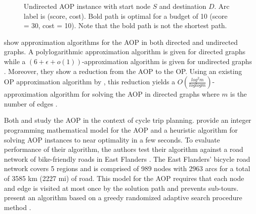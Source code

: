 \documentclass[honors]{union-cs-thesis}
\begin{document}
\begin{figure}[h]
\begin{center}
\end{center}
\caption{Undirected AOP instance with start node $S$ and destination $D$. Arc label is (score, cost). Bold path is optimal for a budget of 10 (score = 30, cost = 10). Note that the bold path is not the shortest path.\label{fig:aop-example}}
\end{figure}

 
\citeauthor{gavalas2015approximation} show approximation algorithms for the AOP in both directed and undirected graphs. A polylogarithmic approximation algorithm is given for directed graphs while a $(6 + \epsilon + o(1))$-approximation algorithm is given for undirected graphs \cite{gavalas2015approximation}. Moreover, they show a reduction from the AOP to the OP. Using an existing OP approximation algorithm by \citeauthor{nagarajan2011directed}, this reduction yields a $O(\frac{log^2m}{loglogm})$-approximation algorithm for solving the AOP in directed graphs where $m$ is the number of edges \cite{gavalas2015approximation}.

Both \citeauthor{souffriau2011planning} and \citeauthor{verbeeck2014extension} study the AOP in the context of cycle trip planning. \citeauthor{souffriau2011planning} provide an integer programming mathematical model for the AOP and a heuristic algorithm for solving AOP instances to near optimality in a few seconds. To evaluate performance of their algorithm, the authors test their algorithm against a road network of bike-friendly roads in East Flanders \cite{souffriau2011planning}. The East Flanders' bicycle road network covers 5 regions and is comprised of 989 nodes with 2963 arcs for a total of 3585 km (2227 mi) of road. This model for the AOP requires that each node and edge is visited at most once by the solution path and prevents sub-tours. \citeauthor{souffriau2011planning} present an algorithm based on a greedy randomized adaptive search procedure method \cite{souffriau2011planning}.
\end{document}
